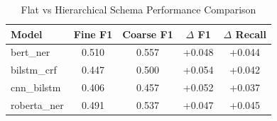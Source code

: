 \begin{table}[htbp]
\centering
\caption{Flat vs Hierarchical Schema Performance Comparison}
\label{tab:flat-vs-hierarchical}
\begin{tabular}{lcccc}
\toprule
Model & Fine F1 & Coarse F1 & $\Delta$ F1 & $\Delta$ Recall \\
\midrule
bert\_ner & 0.510 & 0.557 & +0.048 & +0.044 \\
bilstm\_crf & 0.447 & 0.500 & +0.054 & +0.042 \\
cnn\_bilstm & 0.406 & 0.457 & +0.052 & +0.037 \\
roberta\_ner & 0.491 & 0.537 & +0.047 & +0.045 \\
\bottomrule
\end{tabular}
\end{table}